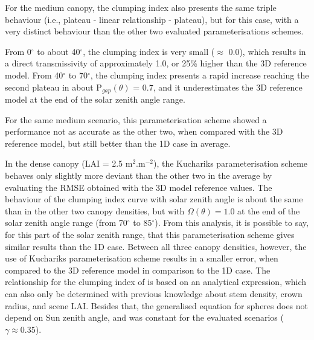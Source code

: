 For the medium canopy, the clumping index also presents the same triple behaviour (i.e., plateau - linear relationship - plateau), but for this case, with a very distinct behaviour than the other two evaluated parameterisations schemes.

From 0$^{\circ}$ to about 40$^{\circ}$, the clumping index is very small ($\approx$ 0.0), which results in a direct transmissivity of approximately 1.0, or 25\% higher than the 3D reference model. From 40$^{\circ}$ to 70$^{\circ}$, the clumping index presents a rapid increase reaching the second plateau in about P$_{gap}(\theta)$ = 0.7, and it underestimates the 3D reference model at the end of the solar zenith angle range.

For the same medium scenario, this parameterisation scheme showed a performance not as accurate as the other two, when compared with the 3D reference model, but still better than the 1D case in average.

In the dense canopy (LAI = 2.5 m$^2$.m$^{-2}$), the Kucharik\textquotesingle s parameterisation scheme behaves only slightly more deviant than the other two in the average by evaluating the RMSE obtained with the 3D model reference values. The behaviour of the clumping index curve with solar zenith angle is about the same than in the other two canopy densities, but with $\Omega(\theta) = 1.0$ at the end of the solar zenith angle range (from 70$^{\circ}$ to 85$^{\circ}$). From this analysis, it is possible to say, for this part of the solar zenith range, that this parameterisation scheme gives similar results than the 1D case. Between all three canopy densities, however, the use of Kucharik\textquotesingle s parameterisation scheme results in a smaller error, when compared to the 3D reference model in comparison to the 1D case. The relationship for the clumping index of \citet{Ni-Meister2010} is based on an analytical expression, which can also only be determined with previous knowledge about stem density, crown radius, and scene LAI. Besides that, the generalised equation for spheres does not depend on Sun zenith angle, and was constant for the evaluated scenarios ($\gamma \approx 0.35$).

